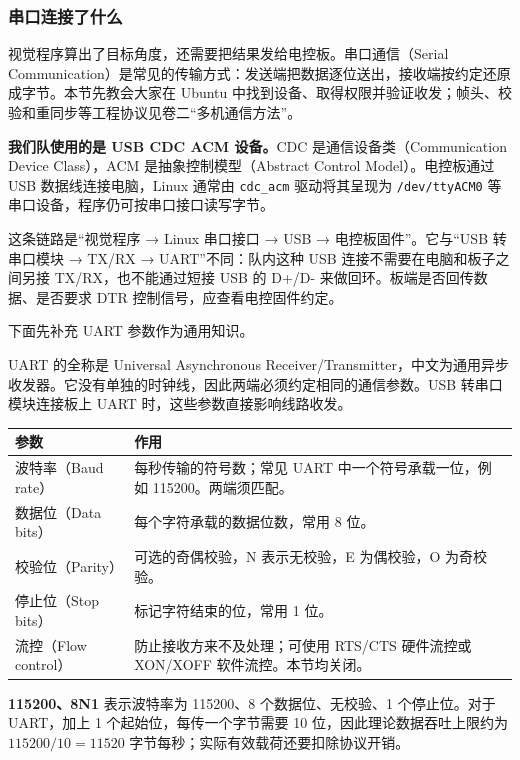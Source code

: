 \begingroup
\setlength{\emergencystretch}{3em}
\subsubsection{串口连接了什么}
\label{sec:linux-serial}

视觉程序算出了目标角度，还需要把结果发给电控板。串口通信（Serial Communication）是常见的传输方式：发送端把数据逐位送出，接收端按约定还原成字节。本节先教会大家在 Ubuntu 中找到设备、取得权限并验证收发；帧头、校验和重同步等工程协议见卷二“多机通信方法”。

\textbf{我们队使用的是 USB CDC ACM 设备。}CDC 是通信设备类（Communication Device Class），ACM 是抽象控制模型（Abstract Control Model）。电控板通过 USB 数据线连接电脑，Linux 通常由 \texttt{cdc\_acm} 驱动将其呈现为 \texttt{/dev/ttyACM0} 等串口设备，程序仍可按串口接口读写字节。

这条链路是“视觉程序 → Linux 串口接口 → USB → 电控板固件”。它与“USB 转串口模块 → TX/RX → UART”不同：队内这种 USB 连接不需要在电脑和板子之间另接 TX/RX，也不能通过短接 USB 的 D+/D- 来做回环。板端是否回传数据、是否要求 DTR 控制信号，应查看电控固件约定。

下面先补充 UART 参数作为通用知识。

UART 的全称是 Universal Asynchronous Receiver/Transmitter，中文为通用异步收发器。它没有单独的时钟线，因此两端必须约定相同的通信参数。USB 转串口模块连接板上 UART 时，这些参数直接影响线路收发。

\begin{center}
\begin{tabular}{p{}p{}}
\toprule[1.5pt]
参数 & 作用 \\
\midrule[1pt]
波特率（Baud rate） & 每秒传输的符号数；常见 UART 中一个符号承载一位，例如 115200。两端须匹配。\\
数据位（Data bits） & 每个字符承载的数据位数，常用 8 位。\\
校验位（Parity） & 可选的奇偶校验，N 表示无校验，E 为偶校验，O 为奇校验。\\
停止位（Stop bits） & 标记字符结束的位，常用 1 位。\\
流控（Flow control） & 防止接收方来不及处理；可使用 RTS/CTS 硬件流控或 XON/XOFF 软件流控。本节均关闭。\\
\bottomrule[1.5pt]
\end{tabular}
\end{center}

\textbf{115200、8N1} 表示波特率为 115200、8 个数据位、无校验、1 个停止位。对于 UART，加上 1 个起始位，每传一个字节需要 10 位，因此理论数据吞吐上限约为 $115200/10=11520$ 字节每秒；实际有效载荷还要扣除协议开销。

